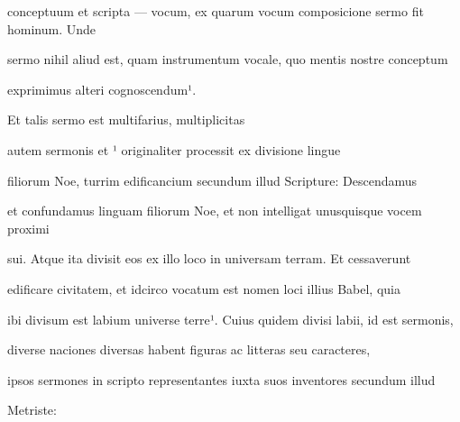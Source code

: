 conceptuum et scripta — vocum, ex quarum vocum composicione sermo fit hominum. Unde

sermo nihil aliud est, quam instrumentum vocale, quo mentis nostre conceptum

\splitlines{}

exprimimus alteri cognoscendum¹.

\indentK  Et talis sermo est multifarius, multiplicitas

\fulllines{}
autem sermonis et ¹ originaliter processit ex divisione lingue

filiorum Noe, turrim edificancium secundum illud Scripture: Descendamus

et confundamus linguam filiorum Noe, et non intelligat unusquisque vocem proximi

sui. Atque ita divisit eos ex illo loco in universam terram. Et cessaverunt

edificare civitatem, et idcirco vocatum est nomen loci illius Babel, quia

ibi divisum est labium universe terre¹. Cuius quidem divisi labii, id est sermonis,

diverse naciones diversas habent figuras ac litteras seu caracteres,



\fullpreviouslines
{
\color{blue}


ipsos sermones in scripto representantes iuxta suos inventores secundum illud

Metriste:

}


